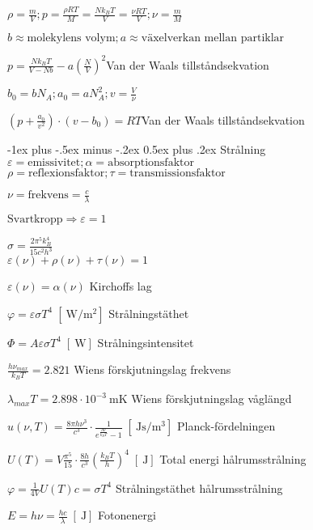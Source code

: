\documentclass[10pt,landscape]{article}
\makeatletter
\newcommand{\unit}[1]{
\;[\SI{}{#1}]
}
\renewcommand{\section}{\@startsection{section}{1}{0mm}%
                                {-1ex plus -.5ex minus -.2ex}%
                                {0.5ex plus .2ex}%
                                {\normalfont\large\bfseries}
                                }
\makeatother
\begin{document}
\begin{multicols}{3}
$\displaystyle \rho = \frac{m}{V}; p = \frac{\rho R T}{M} = \frac{Nk_BT}{V} = \frac{\nu R T}{V}; \nu = \frac{m}{M}$

$\displaystyle b \approx \text{molekylens volym}; a \approx \text{växelverkan mellan partiklar}$

$\displaystyle p = \frac{Nk_BT}{V - Nb} - a\left( \frac{N}{V} \right)^2$\hfill Van der Waals tillståndsekvation

$b_0 = bN_A; a_0 = aN_A^2; v = \frac{V}{\nu}$

$\displaystyle \left(p + \frac{a_0}{v^2} \right)\cdot (v - b_0) = RT$\hfill Van der Waals tillståndsekvation

\section{Strålning}
$\varepsilon = \text{emissivitet}; \alpha = \text{absorptionsfaktor}$\\
$\rho = \text{reflexionsfaktor}; \tau = \text{transmissionsfaktor}$

$\nu = \text{frekvens} = \frac{c}{\lambda}$

$\text{Svartkropp} \Rightarrow \varepsilon = 1$

$\sigma = \frac{2\pi^5 k_B^4}{15 c^2 h^3}$
$$$$
$\varepsilon(\nu) + \rho(\nu) + \tau(\nu) = 1$

$\varepsilon(\nu) = \alpha(\nu) $  \hfill Kirchoffs lag


$\varphi = \varepsilon \sigma T^4 \unit{\watt\per\meter^2}$  \hfill Strålningstäthet


$\Phi = A \varepsilon \sigma T^4 \unit{\watt}$  \hfill Strålningsintensitet


$\frac{h\nu_{max}}{k_B T} = 2.821$  \hfill Wiens förskjutningslag frekvens


$\lambda_{max}T = 2.898\cdot 10^{-3} \SI{}{\meter\kelvin}$  \hfill Wiens förskjutningslag våglängd

$\displaystyle u(\nu, T) = \frac{8\pi h \nu^3}{c^3} \cdot \frac{1}{e^{\frac{h\nu}{k_BT}} - 1} \unit{\joule\second\per\cubic\meter}$  \hfill Planck-fördelningen


$\displaystyle U(T) = V \frac{\pi^5}{15} \cdot \frac{8h}{c^3}\left(\frac{k_BT}{h}\right)^4 \unit{\joule}$  \hfill Total energi hålrumsstrålning


$\varphi = \frac{1}{4V} U(T)c = \sigma T^4$  \hfill Strålningstäthet hålrumsstrålning


$E = h\nu = \frac{hc}{\lambda} \unit{\joule}$  \hfill Fotonenergi


\end{multicols}
\end{document}
